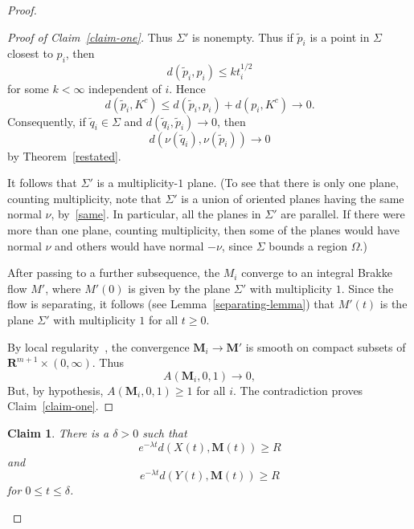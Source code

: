 \documentclass{amsart}
\newcommand{\MMM}{\mathbf M}
\newcommand{\RR}{\mathbf{R}}  %
\newtheorem{claim}{Claim}
\theoremstyle{definition}
\theoremstyle{definition}
\begin{document}
\begin{proof}
\begin{proof}[Proof of Claim~\ref{claim-one}]
Thus $\Sigma'$ is nonempty.
Thus if $\tilde p_i$ is a point in $\Sigma$ closest to $p_i$, then
\[
   d(\tilde p_i, p_i) \le kt_i^{1/2}
\]
for some $k<\infty$ independent of $i$.
Hence
\[
  d(\tilde p_i, K^c) \le d(\tilde p_i,p_i) + d(p_i,K^c) \to 0.
\]
  Consequently, if $\tilde q_i\in \Sigma$ and $d(\tilde q_i,\tilde p_i)\to 0$,
then
\begin{equation}\label{same}
     d(\nu(\tilde q_i), \nu(\tilde p_i)) \to 0
\end{equation}
by Theorem~\ref{restated}.

It follows that $\Sigma'$ is a multiplicity-$1$ plane.
(To see that there is only one plane, counting multiplicity,
 note that $\Sigma'$ is a union of oriented planes having the same normal $\nu$, by~\eqref{same}.
In particular, all the planes in $\Sigma'$ are parallel.  If there were more than one
plane, counting multiplicity, then some of the planes would have normal $\nu$ and others
would have normal $-\nu$, since $\Sigma$ bounds a region $\Omega$.)





After passing to a further subsequence, the $M_i$ converge to an integral
Brakke flow $M'$, where $M'(0)$ is given by the plane $\Sigma'$ with
multiplicity $1$.  
Since the flow is separating, it follows (see Lemma~\ref{separating-lemma})
that $M'(t)$ is the plane $\Sigma'$ with multiplicity $1$ for all $t\ge 0$.


By local regularity~\cite{white-local}, the convergence $\MMM_i\to \MMM'$ is smooth on compact
subsets of $\RR^{m+1}\times (0,\infty)$.  Thus
\[
   A(\MMM_i,0,1) \to 0,
\]
But, by hypothesis, $A(\MMM_i,0,1)\ge 1$ for all $i$.
  The contradiction proves Claim~\ref{claim-one}.
\end{proof}

\begin{claim}\label{claim-two}
There is a $\delta>0$ such that 
\[
    e^{-\lambda t} d(X(t),\MMM(t)) \ge R
\]
and
\[
   e^{-\lambda t} d(Y(t),\MMM(t)) \ge R
\]
for $0\le t\le \delta$.
\end{claim}


\end{proof}
\end{document}

